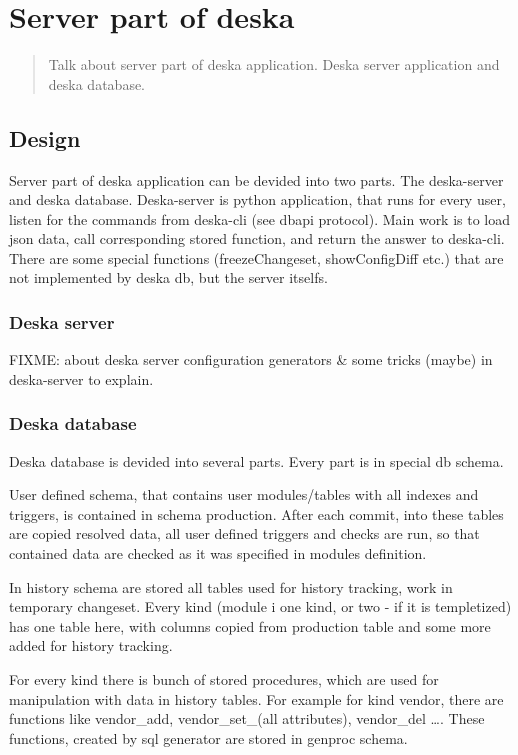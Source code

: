 \documentclass[deska]{subfiles}
\begin{document}
\chapter{Server part of deska}
\label{sec:deska-server}

\begin{abstract}
Talk about server part of deska application. Deska server application and deska database.
\end{abstract}

\section{Design}
Server part of deska application can be devided into two parts. The deska-server and deska database.
Deska-server is python application, that runs for every user, listen for the commands from deska-cli (see dbapi protocol).
Main work is to load json data, call corresponding stored function, and return the answer to deska-cli.
There are some special functions (freezeChangeset, showConfigDiff etc.) that are not implemented by deska db, but the server itselfs.

\subsection{Deska server}
FIXME: about deska server configuration generators & some tricks (maybe) in deska-server to explain.

\subsection{Deska database}
Deska database is devided into several parts. Every part is in special db schema. 

User defined schema, that contains user modules/tables with all indexes and triggers, is contained in schema production. After each commit, into these tables are copied resolved data, all user defined triggers and checks are run, so that contained data are checked as it was specified in modules definition.

In history schema are stored all tables used for history tracking, work in temporary changeset. Every kind (module i one kind, or two - if it is templetized) has one table here, with columns copied from production table and some more added for history tracking.

For every kind there is bunch of stored procedures, which are used for manipulation with data in history tables. For example for kind vendor, there are functions like vendor\_add, vendor\_set\_(all attributes), vendor\_del ….
These functions, created by sql generator are stored in genproc schema.
\end{document}
